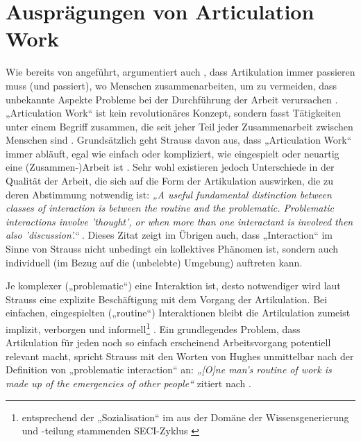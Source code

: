 \section{Ausprägungen von Articulation Work} %
\label{sec:arten_von_articulation_work}

Wie bereits von \citet{Gerson86} angeführt, argumentiert auch \citeauthor{Strauss88}, dass Artikulation immer passieren muss (und passiert), wo Menschen zusammenarbeiten, um zu vermeiden, dass unbekannte Aspekte Probleme bei der Durchführung der Arbeit verursachen \citep{Strauss88}. „Articulation Work“ ist kein revolutionäres Konzept, sondern fasst Tätigkeiten unter einem Begriff zusammen, die seit jeher Teil jeder Zusammenarbeit zwischen Menschen sind \citep{Strauss88}. Grundsätzlich geht Strauss davon aus, dass „Articulation Work“ immer abläuft, egal wie einfach oder kompliziert, wie eingespielt oder neuartig eine (Zusammen-)Arbeit ist \citep{Strauss88}. Sehr wohl existieren jedoch Unterschiede in der Qualität der Arbeit, die sich auf die Form der Artikulation auswirken, die zu deren Abstimmung notwendig ist: \emph{„A useful fundamental distinction between classes of interaction is between the routine and the problematic. Problematic interactions involve 'thought', or when more than one interactant is involved then also 'discussion'.“} \citep{Strauss93}. Dieses Zitat zeigt im Übrigen auch, dass „Interaction“ im Sinne von Strauss nicht unbedingt ein kollektives Phänomen ist, sondern auch individuell (im Bezug auf die (unbelebte) Umgebung) auftreten kann.

Je komplexer („problematic“) eine Interaktion ist, desto notwendiger wird laut Strauss eine explizite Beschäftigung mit dem Vorgang der Artikulation. Bei einfachen, eingespielten („routine“) Interaktionen bleibt die Artikulation zumeist implizit, verborgen und informell\footnote{entsprechend der „Sozialisation“ im aus der Domäne der Wissensgenerierung und -teilung stammenden SECI-Zyklus \citep{Nonaka95}} \citep{Hampson05}. Ein grundlegendes Problem, dass Artikulation für jeden noch so einfach erscheinend Arbeitsvorgang potentiell relevant macht, spricht Strauss mit den Worten von Hughes unmittelbar nach der Definition von „problematic interaction“ an: \emph{„[O]ne man's routine of work is made up of the emergencies of other people“} \citep{Hughes71} zitiert nach \citep{Strauss93}.

